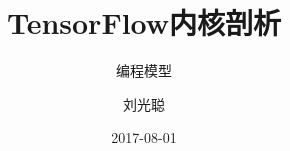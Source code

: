 \title[TensorFlow Internals]
{TensorFlow内核剖析}

\subtitle{编程模型}

\author[刘光聪]
{ 刘光聪
}


\date[2017.08]{2017-08-01}

